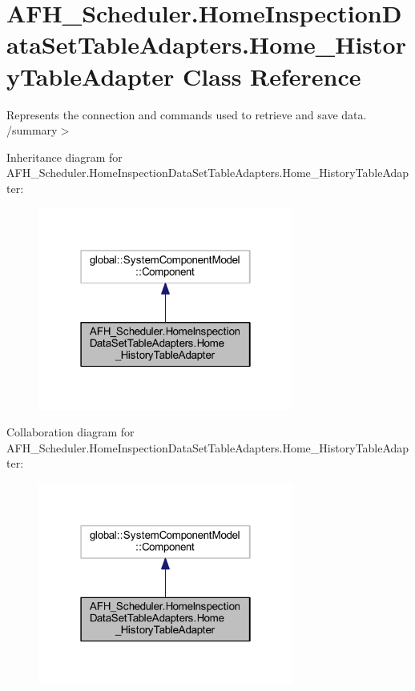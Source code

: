 \section{A\+F\+H\+\_\+\+Scheduler.\+Home\+Inspection\+Data\+Set\+Table\+Adapters.\+Home\+\_\+\+History\+Table\+Adapter Class Reference}
\label{class_a_f_h___scheduler_1_1_home_inspection_data_set_table_adapters_1_1_home___history_table_adapter}


Represents the connection and commands used to retrieve and save data. /summary$>$  




Inheritance diagram for A\+F\+H\+\_\+\+Scheduler.\+Home\+Inspection\+Data\+Set\+Table\+Adapters.\+Home\+\_\+\+History\+Table\+Adapter\+:
\nopagebreak
\begin{figure}[H]
\begin{center}
\leavevmode
\includegraphics[width=238pt]{class_a_f_h___scheduler_1_1_home_inspection_data_set_table_adapters_1_1_home___history_table_adapter__inherit__graph}
\end{center}
\end{figure}


Collaboration diagram for A\+F\+H\+\_\+\+Scheduler.\+Home\+Inspection\+Data\+Set\+Table\+Adapters.\+Home\+\_\+\+History\+Table\+Adapter\+:
\nopagebreak
\begin{figure}[H]
\begin{center}
\leavevmode
\includegraphics[width=238pt]{class_a_f_h___scheduler_1_1_home_inspection_data_set_table_adapters_1_1_home___history_table_adapter__coll__graph}
\end{center}
\end{figure}
